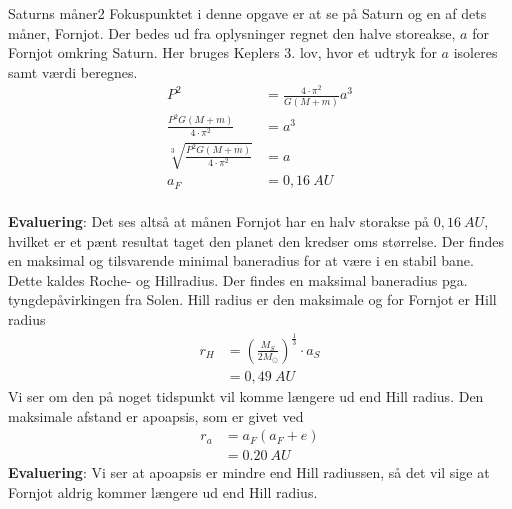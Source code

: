 \begin{opgave}{Saturns måner}{2}
\opg Fokuspunktet i denne opgave er at se på Saturn og en af dets måner, Fornjot. Der bedes ud fra oplysninger regnet den halve storeakse, $a$ for Fornjot omkring Saturn. Her bruges Keplers 3. lov, hvor et udtryk for $a$ isoleres samt værdi beregnes.
\begin{align*}
P^2 &= \frac{4\cdot \pi^2}{G(M+m)}a^3 \\
\frac{P^2 G (M+m)}{4\cdot \pi^2} &= a^3 \\
\sqrt[3]{\frac{P^2 G (M+m)}{4\cdot \pi^2}} &= a \\
a_F &= 0,16~\si{AU} \\
\end{align*} 

\textbf{Evaluering}: Det ses altså at månen Fornjot har en halv storakse på $0,16~\si{AU}$, hvilket er et pænt resultat taget den planet den kredser oms størrelse.
\opg Der findes en maksimal og tilsvarende minimal baneradius for at være i en stabil bane. Dette kaldes Roche- og Hillradius. Der findes en maksimal baneradius pga. tyngdepåvirkingen fra Solen. Hill radius er den maksimale og for Fornjot er Hill radius
\begin{align*}
r_H &= \left(\frac{M_S}{2M_{\odot}}\right)^{\frac{1}{3}}\cdot a_S \\
&= 0,49~\si{AU}
\end{align*}
\opg Vi ser om den på noget tidspunkt vil komme længere ud end Hill radius. Den maksimale afstand er apoapsis, som er givet ved
\begin{align*}
r_a &= a_F\left( a_F+e\right) \\
&= 0.20~\si{AU}
\end{align*} 
\textbf{Evaluering}: Vi ser at apoapsis er mindre end Hill radiussen, så det vil sige at Fornjot aldrig kommer længere ud end Hill radius.
\end{opgave}



